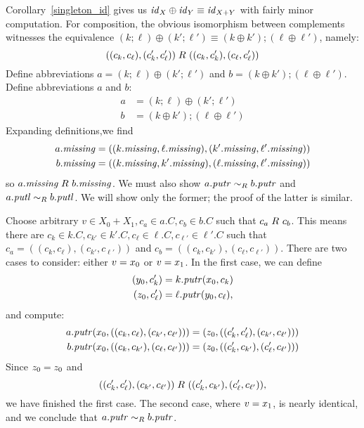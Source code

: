 \begin{defn}[$R$-similarity]
\begin{theorem}
\begin{lemma}
\begin{theorem}[No products]
\begin{lemma}
\begin{functoriality}
Corollary~\ref{singleton_id} gives us $\mathit{id}_X \oplus \mathit{id}_Y \equiv \mathit{id}_{X+Y}$
with fairly minor computation. For composition, the obvious
isomorphism between complements witnesses the equivalence
$(k;\ell)\oplus(k';\ell') \equiv (k \oplus k');(\ell \oplus \ell')$, namely:
\[((c_k,c_\ell),(c_k',c_\ell'))\mathrel{R_{}}((c_k,c_k'),(c_\ell,c_\ell'))\]
\iffull
Define abbreviations $a=(k;\ell)\oplus(k';\ell')$ and
$b=(k \oplus k');(\ell\oplus\ell')$.
\else
Define abbreviations $a$ and $b$:
\begin{align*}
    a &= (k;\ell)\oplus(k';\ell') \\
    b &= (k \oplus k');(\ell \oplus \ell')
\end{align*}
\fi
Expanding definitions,\iffull\else we find\fi
\begin{align*}
    a.\mathit{missing} &= ((k.\mathit{missing},\ell.\mathit{missing}),(k'.\mathit{missing},\ell'.\mathit{missing})) \\
    b.\mathit{missing} &= ((k.\mathit{missing},k'.\mathit{missing}),(\ell.\mathit{missing},\ell'.\mathit{missing}))
\end{align*}
so $a.\mathit{missing} \mathrel{R_{}} b.\mathit{missing}$. We must also show $a.\mathit{putr} \sim_R b.\mathit{putr}$
and $a.\mathit{putl} \sim_R b.\mathit{putl}$. We will show only the former; the proof of the
latter is similar.

Choose arbitrary $v \in X_0+X_1,c_a \in a.C,c_b \in b.C$ such that $c_a
\mathrel{R_{}} c_b$. This means there are $c_k \in k.C,c_{k'} \in k'.C,c_\ell \in
\ell.C,c_{\ell'} \in \ell'.C$ such that $c_a =
((c_k,c_\ell),(c_{k'},c_{\ell'}))$ and $c_b =
((c_k,c_{k'}),(c_\ell,c_{\ell'}))$. There are two cases to consider: either
$v= x_0$ or $v= x_1$. In the first case, we can define
\begin{align*}
    (y_0,c_k') &= k.\mathit{putr}(x_0,c_k) \\
    (z_0,c_\ell') &= \ell.\mathit{putr}(y_0,c_\ell),
\end{align*}
and compute:
\begin{align*}
    a.\mathit{putr}( x_0,((c_k,c_\ell),(c_{k'},c_{\ell'}))) &= (
    z_0,((c_k',c_\ell'),(c_{k'},c_{\ell'}))) \\
    b.\mathit{putr}( x_0,((c_k,c_{k'}),(c_\ell,c_{\ell'}))) &= (
    z_0,((c_k',c_{k'}),(c_\ell',c_{\ell'})))
\end{align*}
Since $ z_0 =  z_0$ and
\[((c_k',c_\ell'),(c_{k'},c_{\ell'})) \mathrel{R_{}}
((c_k',c_{k'}),(c_\ell',c_{\ell'})),\]
we have finished the first case. The second case, where $v= x_1$, is
nearly identical, and we conclude that $a.\mathit{putr} \sim_R b.\mathit{putr}$.
\end{functoriality}
\fi


\end{lemma}
\end{theorem}
\end{lemma}
\end{theorem}
\end{defn}
